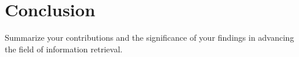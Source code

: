 \section{Conclusion}  
\label{sec:conclusion}  
Summarize your contributions and the significance of your findings in advancing the field of information retrieval.  
